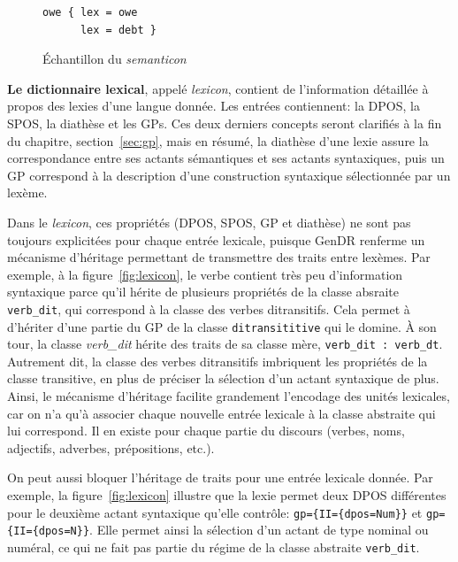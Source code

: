 \begin{figure}
\begin{lstlisting}[language=mate]
owe { lex = owe
      lex = debt }
\end{lstlisting}
  \caption{Échantillon du \emph{semanticon}}
	\label{fig:semanticon}
\end{figure}

\textbf{Le dictionnaire lexical}, appelé \emph{lexicon}, contient de l'information détaillée à propos des lexies d'une langue donnée. Les entrées contiennent: la \ac{DPOS}, la \ac{SPOS}, la diathèse et les \acp{GP}. Ces deux derniers concepts seront clarifiés à la fin du chapitre, section~\ref{sec:gp}, mais en résumé, la diathèse d'une lexie assure la correspondance entre ses actants sémantiques et ses actants syntaxiques, puis un \ac{GP} correspond à la description d'une construction syntaxique sélectionnée par un lexème.

Dans le \emph{lexicon}, ces propriétés (\ac{DPOS}, \ac{SPOS}, \ac{GP} et diathèse) ne sont pas toujours explicitées pour chaque entrée lexicale, puisque GenDR renferme un mécanisme d'héritage permettant de transmettre des traits entre lexèmes. Par exemple, à la figure~\ref{fig:lexicon}, le verbe  contient très peu d'information syntaxique parce qu'il hérite de plusieurs propriétés de la classe absraite \texttt{verb\_dit}, qui correspond à la classe des verbes ditransitifs. Cela permet à  d'hériter d'une partie du \ac{GP} de la classe \lstinline|ditransititive| qui le domine. À son tour, la classe \emph{verb\_dit} hérite des traits de sa classe mère, \lstinline|verb_dit : verb_dt|. Autrement dit, la classe des verbes ditransitifs imbriquent les propriétés de la classe transitive, en plus de préciser la sélection d'un actant syntaxique de plus. Ainsi, le mécanisme d'héritage facilite grandement l'encodage des unités lexicales, car on n'a qu'à associer chaque nouvelle entrée lexicale à la classe abstraite qui lui correspond. Il en existe pour chaque partie du discours (verbes, noms, adjectifs, adverbes, prépositions, etc.).

On peut aussi bloquer l'héritage de traits pour une entrée lexicale donnée. Par exemple, la figure~\ref{fig:lexicon} illustre que la lexie  permet deux \ac{DPOS} différentes pour le deuxième actant syntaxique qu'elle contrôle: \lstinline!gp={II={dpos=Num}}! et \lstinline!gp={II={dpos=N}}!. Elle permet ainsi la sélection d'un actant de type nominal ou numéral, ce qui ne fait pas partie du régime de la classe abstraite \texttt{verb\_dit}.

